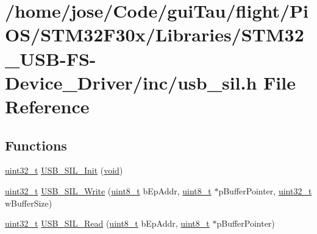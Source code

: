 \hypertarget{_s_t_m32_f30x_2_libraries_2_s_t_m32___u_s_b-_f_s-_device___driver_2inc_2usb__sil_8h}{\section{/home/jose/\-Code/gui\-Tau/flight/\-Pi\-O\-S/\-S\-T\-M32\-F30x/\-Libraries/\-S\-T\-M32\-\_\-\-U\-S\-B-\/\-F\-S-\/\-Device\-\_\-\-Driver/inc/usb\-\_\-sil.h File Reference}
\label{_s_t_m32_f30x_2_libraries_2_s_t_m32___u_s_b-_f_s-_device___driver_2inc_2usb__sil_8h}
}
\subsection*{Functions}
\begin{DoxyCompactItemize}
\item 
\hyperlink{stdint_8h_a435d1572bf3f880d55459d9805097f62}{uint32\-\_\-t} \hyperlink{_s_t_m32_f30x_2_libraries_2_s_t_m32___u_s_b-_f_s-_device___driver_2inc_2usb__sil_8h_a35769edfa7e5e32034d0c65440369cda}{U\-S\-B\-\_\-\-S\-I\-L\-\_\-\-Init} (\hyperlink{group___n_a_m_e_ga18028b8badbf1ea7e704ccac3c488e82}{void})
\item 
\hyperlink{stdint_8h_a435d1572bf3f880d55459d9805097f62}{uint32\-\_\-t} \hyperlink{_s_t_m32_f30x_2_libraries_2_s_t_m32___u_s_b-_f_s-_device___driver_2inc_2usb__sil_8h_ab005324bdedc235ce1f65121467b2e72}{U\-S\-B\-\_\-\-S\-I\-L\-\_\-\-Write} (\hyperlink{stdint_8h_aba7bc1797add20fe3efdf37ced1182c5}{uint8\-\_\-t} b\-Ep\-Addr, \hyperlink{stdint_8h_aba7bc1797add20fe3efdf37ced1182c5}{uint8\-\_\-t} $\ast$p\-Buffer\-Pointer, \hyperlink{stdint_8h_a435d1572bf3f880d55459d9805097f62}{uint32\-\_\-t} w\-Buffer\-Size)
\item 
\hyperlink{stdint_8h_a435d1572bf3f880d55459d9805097f62}{uint32\-\_\-t} \hyperlink{_s_t_m32_f30x_2_libraries_2_s_t_m32___u_s_b-_f_s-_device___driver_2inc_2usb__sil_8h_ab6600b124ff88cf2690b842424888629}{U\-S\-B\-\_\-\-S\-I\-L\-\_\-\-Read} (\hyperlink{stdint_8h_aba7bc1797add20fe3efdf37ced1182c5}{uint8\-\_\-t} b\-Ep\-Addr, \hyperlink{stdint_8h_aba7bc1797add20fe3efdf37ced1182c5}{uint8\-\_\-t} $\ast$p\-Buffer\-Pointer)
\end{DoxyCompactItemize}


